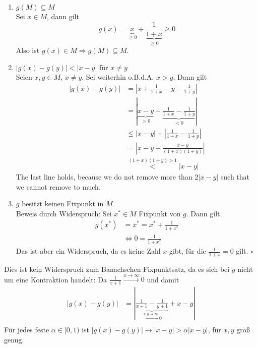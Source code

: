 \documentclass[11pt,a4paper,ngerman]{article}
\begin{document}
\begin{enumerate}
\item $g(M) \subseteq M$\\
  Sei $x \in M$, dann gilt 
  \begin{equation*}
    g(x) = \underbrace{x}_{\geq 0} + \underbrace{\frac{1}{1+x}}_{\geq 0} \geq 0
  \end{equation*}
  Also ist $g(x) \in M \Rightarrow g(M) \subseteq M$.
\item $|g(x) - g(y)| < |x-y|$ für $x \neq y$\\
  Seien $x,y \in M$, $x \neq y$. Sei weiterhin o.B.d.A. $x > y$. Dann gilt
  \begin{equation*}\begin{split}
    |g(x) - g(y)| &= |x + \frac{1}{1+x} - y - \frac{1}{1+y}|\\
                  &= |\underbrace{x - y}_{> 0} + \underbrace{\frac{1}{1+x} - \frac{1}{1+y}}_{< 0}| \\
                  &\leq |x-y| + |\frac{1}{1+x} - \frac{1}{1+y}|\\
                  &= \left| x - y +\frac{x-y}{(1+x)(1+y)} \right|\\
                  &\overset{(1+x)(1+y) > 1}{<} |x - y|
  \end{split}\end{equation*}
    The last line holds, because we do not remove more than $2|x-y|$ such that we cannot remove to much.
\item $g$ besitzt keinen Fixpunkt in $M$\\
  Beweis durch Widerspruch: Sei $x^* \in M$ Fixpunkt von $g$. Dann gilt
  \begin{equation*}\begin{split}
    g(x^*) &= x^* = x^* + \frac{1}{1+ x^*}\\
    &\Leftrightarrow 0 = \frac{1}{1 + x^*}
  \end{split}\end{equation*}
  Das ist aber ein Widerspruch, da es keine Zahl $x$ gibt, für die $\frac{1}{1+x} = 0$ gilt.
  \mbox{} \hfill $\square$
\end{enumerate}
Dies ist kein Widerspruch zum Banachschen Fixpunktsatz, da es sich bei $g$ nicht um eine
Kontraktion handelt: Da $\frac{1}{x+1} \stackrel{x \to \infty}{\to} 0$ und damit
\begin{equation*}\begin{split}
|g(x) - g(y)| &= |\underbrace{\frac{1}{x+1} - \frac{1}{y+1}}_{\stackrel{x,y \to \infty}{\to} 0}  + x- y| \\
\end{split}\end{equation*} 
Für jedes feste $\alpha \in [0,1)$ ist $|g(x) - g(y)| \to |x-y| > \alpha|x-y|$, für $x,y$ groß genug.
\end{document}
